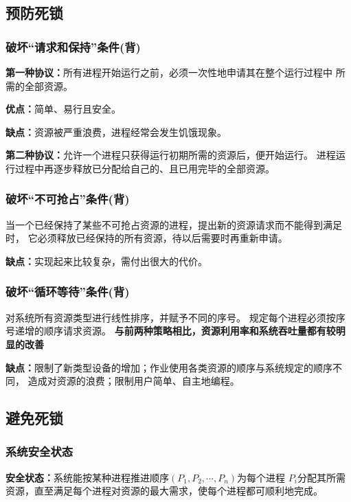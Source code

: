 \documentclass{article}
\begin{document}
\subsection{预防死锁}
\subsubsection{{\color{red}破坏“请求和保持”条件}{\color{green}(背)}}
\textbf{第一种协议：}所有进程开始运行之前，必须一次性地申请其在整个运行过程中
所需的全部资源。

\textbf{优点：}简单、易行且安全。

\textbf{缺点：}资源被严重浪费，进程经常会发生饥饿现象。

\vspace{0.4cm}

\textbf{第二种协议：}允许一个进程只获得运行初期所需的资源后，便开始运行。
进程运行过程中再逐步释放已分配给自己的、且已用完毕的全部资源。

\subsubsection{{\color{red}破坏“不可抢占”条件}{\color{green}(背)}}
当一个已经保持了某些不可抢占资源的进程，提出新的资源请求而不能得到满足时，
它必须释放已经保持的所有资源，待以后需要时再重新申请。

\textbf{缺点：}实现起来比较复杂，需付出很大的代价。
\subsubsection{{\color{red}破坏“循环等待”条件}{\color{green}(背)}}
对系统所有资源类型进行线性排序，并赋予不同的序号。
规定每个进程必须按序号递增的顺序请求资源。
\textbf{与前两种策略相比，资源利用率和系统吞吐量都有较明显的改善}

\textbf{缺点：}限制了新类型设备的增加；作业使用各类资源的顺序与系统规定的顺序不同，
造成对资源的浪费；限制用户简单、自主地编程。

\subsection{避免死锁}
\subsubsection{{\color{red}系统安全状态}}
\textbf{安全状态：}系统能按某种进程推进顺序$(P_1,P_2,\cdots,P_n)$为每个进程
$P_i$分配其所需资源，直至满足每个进程对资源的最大需求，使每个进程都可顺利地完成。
\end{document}
